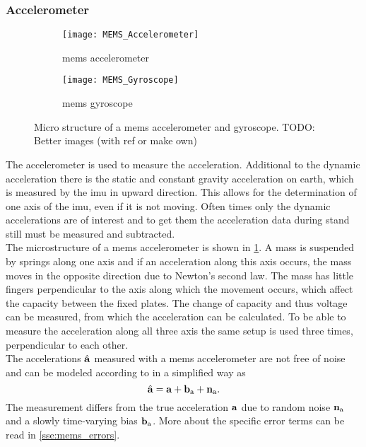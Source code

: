 \subsubsection{ Accelerometer}
\begin{figure}[htb]
	\centering
	\begin{subfigure}{0.48\textwidth}
		\centering
		\texttt{[image: MEMS\_Accelerometer]}
		\caption{\acrshort{mems} accelerometer}
		\label{fig:MEMS_Accelerometer}
	\end{subfigure}
	\begin{subfigure}{0.48\textwidth}
		\centering
		\texttt{[image: MEMS\_Gyroscope]}
		\caption{\acrshort{mems} gyroscope}
		\label{fig:MEMS_Gyroscope}
	\end{subfigure}
	\caption[Micro structure of a \acrshort{mems} accelerometer and gyroscope]{Micro structure of a \acrshort{mems} accelerometer and gyroscope. \color{red}TODO: Better images (with ref or make own)}
	\label{fig:MEMS_design}
\end{figure}
The accelerometer is used to measure the acceleration.
Additional to the dynamic acceleration there is the static and constant gravity acceleration on earth, which is measured by the \gls{imu} in upward direction.
This allows for the determination of one axis of the \gls{imu}, even if it is not moving.
Often times only the dynamic accelerations are of interest and to get them the acceleration data during stand still must be measured and subtracted.\\
The microstructure of a \gls{mems} accelerometer is shown in \cref{fig:MEMS_Accelerometer}.
A mass is suspended by springs along one axis and if an acceleration along this axis occurs, the mass moves in the opposite direction due to Newton's second law.
The mass has little fingers perpendicular to the axis along which the movement occurs, which affect the capacity between the fixed plates.
The change of capacity and thus voltage can be measured, from which the acceleration can be calculated.
To be able to measure the acceleration along all three axis the same setup is used three times, perpendicular to each other.\\
The accelerations $\hat{\vb{a}}$ measured with a \gls{mems} accelerometer are not free of noise and can be modeled according to \cite{Lefferts1982} in a simplified way as
\begin{equation}
	\hat{\vb{a}} = \vb{a} + \vb{b}_\mathrm{a} + \vb{n}_\mathrm{a}.
\end{equation}
The measurement differs from the true acceleration $\vb{a}$ due to random noise $\vb{n}_\mathrm{a}$ and a slowly time-varying bias $\vb{b}_\mathrm{a}$.
More about the specific error terms can be read in \cref{sse:mems_errors}.

